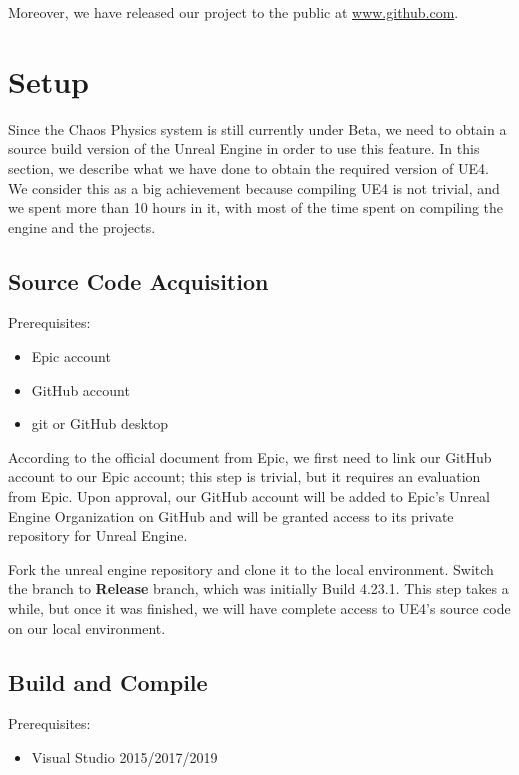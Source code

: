 \documentclass[sigconf]{acmart}
\begin{document}
Moreover, we have released our project to the public at \url{www.github.com}.

\section{Setup}

Since the Chaos Physics system is still currently under Beta, we need to obtain a source build version of the Unreal Engine in order to use this feature. In this section, we describe what we have done to obtain the required version of UE4. We consider this as a big achievement because compiling UE4 is not trivial, and we spent more than 10 hours in it, with most of the time spent on compiling the engine and the projects. 

\subsection{Source Code Acquisition}

Prerequisites:

\begin{itemize}
    \item Epic account
    \item GitHub account
    \item git or GitHub desktop
\end{itemize}

According to the official document from Epic, we first need to link our GitHub account to our Epic account; this step is trivial, but it requires an evaluation from Epic. Upon approval, our GitHub account will be added to Epic's Unreal Engine Organization on GitHub and will be granted access to its private repository for Unreal Engine. 

Fork the unreal engine repository and clone it to the local environment. Switch the branch to \textbf{Release} branch, which was initially Build 4.23.1. This step takes a while, but once it was finished, we will have complete access to UE4's source code on our local environment.

\subsection{Build and Compile}

Prerequisites:

\begin{itemize}
    \item Visual Studio 2015/2017/2019
\end{itemize}
\end{document}
